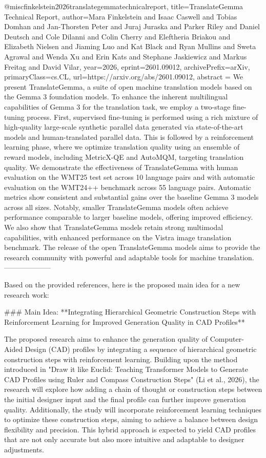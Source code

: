 {}@misc{finkelstein2026translategemmatechnicalreport,
      title={TranslateGemma Technical Report}, 
      author={Mara Finkelstein and Isaac Caswell and Tobias Domhan and Jan-Thorsten Peter and Juraj Juraska and Parker Riley and Daniel Deutsch and Cole Dilanni and Colin Cherry and Eleftheria Briakou and Elizabeth Nielsen and Jiaming Luo and Kat Black and Ryan Mullins and Sweta Agrawal and Wenda Xu and Erin Kats and Stephane Jaskiewicz and Markus Freitag and David Vilar},
      year={2026},
      eprint={2601.09012},
      archivePrefix={arXiv},
      primaryClass={cs.CL},
      url={https://arxiv.org/abs/2601.09012},
      abstract = {We present TranslateGemma, a suite of open machine translation models based on the Gemma 3 foundation models. To enhance the inherent multilingual capabilities of Gemma 3 for the translation task, we employ a two-stage fine-tuning process. First, supervised fine-tuning is performed using a rich mixture of high-quality large-scale synthetic parallel data generated via state-of-the-art models and human-translated parallel data. This is followed by a reinforcement learning phase, where we optimize translation quality using an ensemble of reward models, including MetricX-QE and AutoMQM, targeting translation quality. We demonstrate the effectiveness of TranslateGemma with human evaluation on the WMT25 test set across 10 language pairs and with automatic evaluation on the WMT24++ benchmark across 55 language pairs. Automatic metrics show consistent and substantial gains over the baseline Gemma 3 models across all sizes. Notably, smaller TranslateGemma models often achieve performance comparable to larger baseline models, offering improved efficiency. We also show that TranslateGemma models retain strong multimodal capabilities, with enhanced performance on the Vistra image translation benchmark. The release of the open TranslateGemma models aims to provide the research community with powerful and adaptable tools for machine translation.}
}
        --------------------
        


Based on the provided references, here is the proposed main idea for a new research work:

### Main Idea:
**Integrating Hierarchical Geometric Construction Steps with Reinforcement Learning for Improved Generation Quality in CAD Profiles**

The proposed research aims to enhance the generation quality of Computer-Aided Design (CAD) profiles by integrating a sequence of hierarchical geometric construction steps with reinforcement learning. Building upon the method introduced in "Draw it like Euclid: Teaching Transformer Models to Generate CAD Profiles using Ruler and Compass Construction Steps" (Li et al., 2026), the research will explore how adding a chain of thought or construction steps between the initial designer input and the final profile can further improve generation quality. Additionally, the study will incorporate reinforcement learning techniques to optimize these construction steps, aiming to achieve a balance between design flexibility and precision. This hybrid approach is expected to yield CAD profiles that are not only accurate but also more intuitive and adaptable to designer adjustments.

